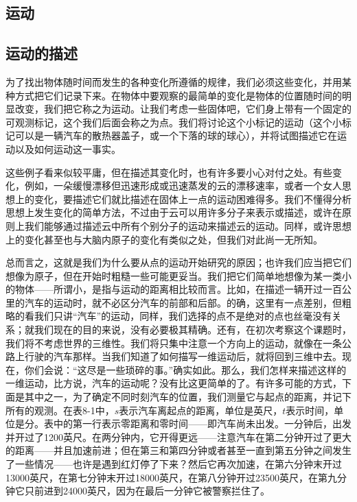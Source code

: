 \documentclass[12pt,oneside]{book}
\begin{document}
\begin{common-format}
\mainmatter

\setcounter{chapter}{7}

\chapter{运动}
\section{运动的描述}
为了找出物体随时间而发生的各种变化所遵循的规律，我们必须这些变化，并用某种方式把它们记录下来。在物体中要观察的最简单的变化是物体的位置随时间的明显改变，我们把它称之为运动。让我们考虑一些固体吧，它们身上带有一个固定的可观测标记，这个我们后面会称之为点。我们将讨论这个小标记的运动（这个小标记可以是一辆汽车的散热器盖子，或一个下落的球的球心），并将试图描述它在运动以及如何运动这一事实。

这些例子看来似较平庸，但在描述其变化时，也有许多要小心对付之处。有些变化，例如，一朵缓慢漂移但迅速形成或迅速蒸发的云的漂移速率，或者一个女人思想上的变化，要描述它们就比描述在固体上一点的运动困难得多。我们不懂得分析思想上发生变化的简单方法，不过由于云可以用许多分子来表示或描述，或许在原则上我们能够通过描述云中所有个别分子的运动来描述云的运动。同样，或许思想上的变化甚至也与大脑内原子的变化有类似之处，但我们对此尚一无所知。

总而言之，这就是我们为什么要从点的运动开始研究的原因；也许我们应当把它们想像为原子，但在开始时粗糙一些可能更妥当。我们把它们简单地想像为某一类小的物体——所谓小，是指与运动的距离相比较而言。比如，在描述一辆开过一百公里的汽车的运动时，就不必区分汽车的前部和后部。的确，这里有一点差别，但粗略的看我们只讲“汽车”的运动，同样，我们选择的点不是绝对的点也丝毫没有关系；就我们现在的目的来说，没有必要极其精确。还有，在初次考察这个课题时，我们将不考虑世界的三维性。我们将只集中注意一个方向上的运动，就像在一条公路上行驶的汽车那样。当我们知道了如何描写一维运动后，就将回到三维中去。现在，你们会说：“这尽是一些琐碎的事。”确实如此。那么，我们怎样来描述这样的一维运动，比方说，汽车的运动呢？没有比这更简单的了。有许多可能的方式，下面是其中之一，为了确定不同时刻汽车的位置，我们测量它与起点的距离，并记下所有的观测。在表8-1中，$s$表示汽车离起点的距离，单位是英尺，$t$表示时间，单位是分。表中的第一行表示零距离和零时间——即汽车尚未出发。一分钟后，出发并开过了1200英尺。在两分钟内，它开得更远——注意汽车在第二分钟开过了更大的距离——并且加速前进；但在第三和第四分钟或者甚至一直到第五分钟之间发生了一些情况——也许是遇到红灯停了下来？然后它再次加速，在第六分钟末开过13000英尺，在第七分钟末开过18000英尺，在第八分钟开过23500英尺，在第九分钟它只前进到24000英尺，因为在最后一分钟它被警察拦住了。


\end{common-format}
\end{document}
